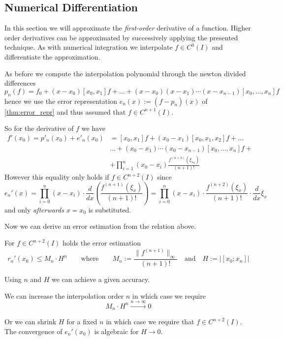 \subsection{Numerical Differentiation}\label{sec:num_diff}
In this section we will approximate the \emph{first-order} derivative of a function.
Higher order derivatives can be approximated by successively applying the presented technique.
As with numerical integration we interpolate \(f \in C^0(I)\) and differentiate the approximation.

As before we compute the interpolation polynomial through the newton divided differences
\[p_n(f) = f_0 + (x-x_0)[x_0, x_1]f + \ldots + (x - x_0)(x - x_1)\cdots(x- x_{n-1})[x_0, \ldots, x_n]f\]
hence we use the error representation \(e_n(x) := (f - p_n)(x)\) of \cref{thm:error_repr} and thus assumed that \(f \in C^{n+1}(I)\).

So for the derivative of \(f\) we have
\begin{equation*}
   \begin{split}
      f'(x_0) = p'_n(x_0) + e'_n(x_0) & = [x_0, x_1]f + (x_0 - x_1)[x_0, x_1, x_2]f + \ldots \\
                                      & \ldots + (x_0 - x_1) \cdots (x_0 - x_{n-1})[x_0, \ldots, x_n]f + \\
                                      & + \prod_{i=1}^n(x_0 - x_i)\frac{f^{(n+2)}(\xi_{x_0})}{(n+1)!}
   \end{split}
\end{equation*}
However this equality only holds if \(f \in C^{n+2}(I)\) since
\[e_n'(x) = \prod_{i=0}^n(x - x_i) \cdot \frac{d}{dx} \left(\frac{f^{(n+1)}(\xi_x)}{(n+1)!}\right) = \prod_{i=0}^n(x - x_i) \cdot \frac{f^{(n+2)}(\xi_x)}{(n+1)!} \cdot \frac{d}{dx} \xi_x\]
and only \emph{afterwards} \(x = x_0\) is substituted.

Now we can derive an error estimation from the relation above.
\begin{theorem}
   For \(f \in C^{n+2}(I)\) holds the error estimation
   \[r_n'(x_0) \leq M_n \cdot H^n \qquad\text{where}\qquad M_n :=\frac{\|f^{(n+1)}\|_\infty}{(n+1)!} \quad\text{and}\quad H := |[x_0; x_n]|\]
\end{theorem}
\begin{remark}
   Using \(n\) and \(H\) we can achieve a given accuracy.

   We can increase the interpolation order \(n\) in which case we require
   \[M_n \cdot H^n \xrightarrow{n \to \infty} 0\]

   Or we can shrink \(H\) for a fixed \(n\) in which case we require that \(f \in C^{n+2}(I)\).
   The convergence of \(e_n'(x_0)\) is algebraic for \(H \to 0\).
\end{remark}

